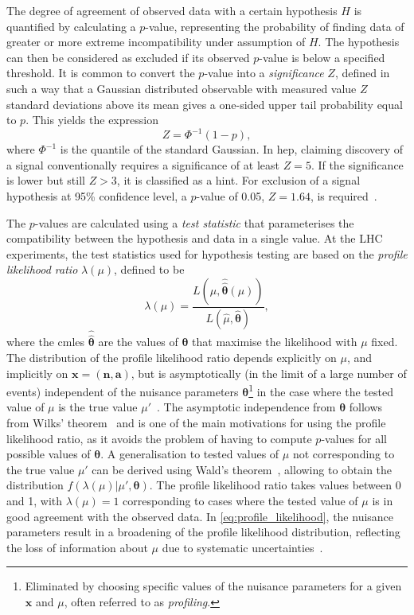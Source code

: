 The degree of agreement of observed data with a certain hypothesis $H$ is quantified by calculating a $p$-value, representing the probability of finding data of greater or more extreme incompatibility under assumption of $H$. The hypothesis can then be considered as excluded if its observed $p$-value is below a specified threshold. It is common to convert the $p$-value into a \textit{significance} $Z$, defined in such a way that a Gaussian distributed observable with measured value $Z$ standard deviations above its mean gives a one-sided upper tail probability equal to $p$. This yields the expression
\begin{equation}
	Z = \Phi^{-1}(1-p),
	\label{eq:significance}
\end{equation}
where $\Phi^{-1}$ is the quantile of the standard Gaussian. In \gls{hep}, claiming discovery of a signal conventionally requires a significance of at least $Z=5$. If the significance is lower but still $Z>3$, it is classified as a hint. For exclusion of a signal hypothesis at 95\% confidence level, a $p$-value of 0.05, \ie $Z = 1.64$, is required~\cite{Cowan:2010js}. 

The $p$-values are calculated using a \textit{test statistic} that parameterises the compatibility between the hypothesis and data in a single value. At the LHC experiments, the test statistics used for hypothesis testing are based on the \textit{profile likelihood ratio} $\lambda(\mu)$, defined to be
\begin{equation}
	\lambda(\mu) = \frac{L(\mu,\boldsymbol{\hat{\hat{\theta}}}(\mu))}{L(\hat{\mu},\hat{\boldsymbol{\theta}})},
	\label{eq:profile_likelihood}
\end{equation}
where the \glspl{cmle} $\boldsymbol{\hat{\hat{\theta}}}$ are the values of $\boldsymbol{\theta}$ that maximise the likelihood with $\mu$ fixed. The distribution of the profile likelihood ratio depends explicitly on $\mu$, and implicitly on $\boldsymbol{x} = (\boldsymbol{n},\boldsymbol{a})$, but is asymptotically  (\ie in the limit of a large number of events) independent of the nuisance parameters $\boldsymbol{\theta}$\footnote{Eliminated by choosing specific values of the nuisance parameters for a given $\boldsymbol{x}$ and $\mu$, often referred to as \textit{profiling}.} in the case where the tested value of $\mu$ is the true value $\mu'$~\cite{Cranmer:2015nia}. The asymptotic independence from $\boldsymbol{\theta}$ follows from Wilks' theorem~\cite{wilks1938} and is one of the main motivations for using the profile likelihood ratio, as it avoids the problem of having to compute $p$-values for all possible values of $\boldsymbol{\theta}$. A generalisation to tested values of $\mu$ not corresponding to the true value $\mu'$ can be derived using Wald's theorem~\cite{wald10.2307/1990256}, allowing to obtain the distribution $f(\lambda(\mu)\vert \mu',\boldsymbol{\theta})$. The profile likelihood ratio takes values between 0 and 1, with $\lambda(\mu) = 1$ corresponding to cases where the tested value of $\mu$ is in good agreement with the observed data. In \cref{eq:profile_likelihood}, the nuisance parameters result in a broadening of the profile likelihood distribution, reflecting the loss of information about $\mu$ due to systematic uncertainties~\cite{Cowan:2010js}.

